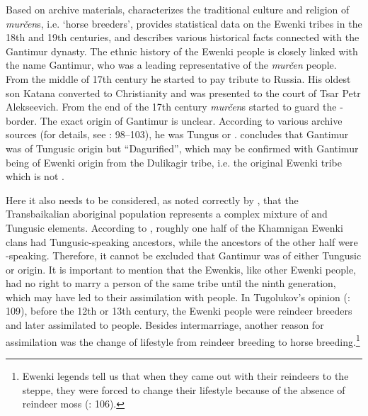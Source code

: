 \documentclass[output=paper,colorlinks,citecolor=brown]{langscibook}
\begin{document}
Based on archive materials, \citet{Tugolukov1975} characterizes the traditional culture and religion of  \textit{murčen}s, i.e. ‘horse breeders’, provides statistical data on the Ewenki tribes in the 18th and 19th centuries, and describes various historical facts connected with the Gantimur dynasty. The ethnic history of the  Ewenki people is closely linked with the name Gantimur, who was a leading representative of the  \textit{murčen} people. From the middle of 17th century he started to pay tribute to Russia. His oldest son Katana converted to Christianity and was presented to the court of  Tsar Petr Alekseevich. From the end of the 17th century  \textit{murčen}s started to guard the - border. The exact origin of Gantimur is unclear. According to various archive sources (for details, see \citealt{Tugolukov1975}: 98--103), he was Tungus or . \citet[101--102]{Tugolukov1975} concludes that Gantimur was of Tungusic origin but “Dagurified”, which may be confirmed with Gantimur being of  Ewenki origin from the Dulikagir tribe, i.e. the original Ewenki tribe which is not .

Here it also needs to be considered, as noted correctly by \citet[16]{Janhunen1991}, that the Transbaikalian aboriginal population represents a complex mixture of  and Tungusic elements. According to \citet[16]{Janhunen1991}, roughly one half of the Khamnigan Ewenki clans had Tungusic-speaking ancestors, while the ancestors of the other half were -speaking. Therefore, it cannot be excluded that Gantimur was of either Tungusic or  origin. It is important to mention that the  Ewenkis, like other Ewenki people, had no right to marry a person of the same tribe until the ninth generation, which may have led to their assimilation with  people. In Tugolukov’s opinion (\citeyear{Tugolukov1975}: 109), before the 12th or 13th century, the Ewenki people were reindeer breeders and later assimilated to  people. Besides intermarriage, another reason for assimilation was the change of lifestyle from reindeer breeding to horse breeding.\footnote{Ewenki legends tell us that when they came out with their reindeers to the steppe, they were forced to change their lifestyle because of the absence of reindeer moss (\citealt{Tugolukov1975}: 106).}
\end{document}
